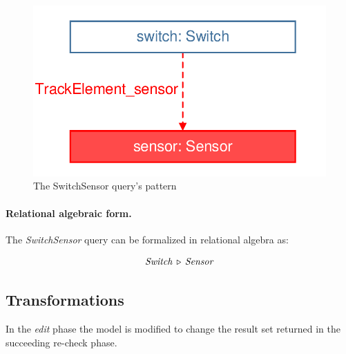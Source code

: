 \begin{figure}[Htb]
		\centering
		\includegraphics[scale=0.4]{figures/trainbenchmark-switchsensor}
		\caption{The SwitchSensor query's pattern}
		\label{fig:trainbenchmark-switchsensor}
\end{figure}

\paragraph{Relational algebraic form.} The \textit{SwitchSensor} query can be formalized in relational algebra as:

$$ \mathit{Switch} \, \triangleright \, \mathit{Sensor} $$


\subsection{Transformations}
\label{sec:transformatios}

In the \emph{edit} phase the model is modified to change the result set returned in the succeeding re-check phase.

